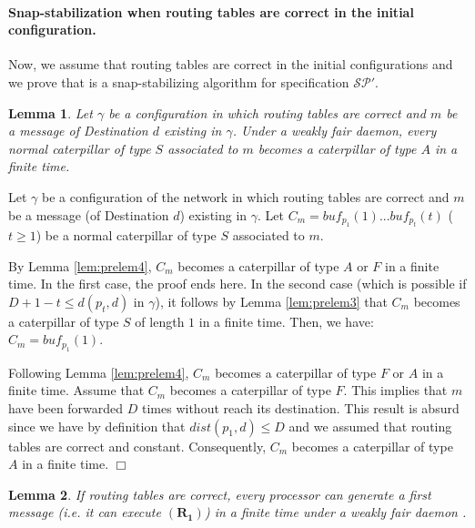 \documentclass[11pt]{article}
\newtheorem{lemma}{Lemma}
\newenvironment{proof}{{\noindent\bf Proof. } }{{\hfill $\Box$}}
\begin{document}
\paragraph{Snap-stabilization when routing tables are correct in the initial configuration.} Now, we assume that routing tables are correct in the initial configurations and we prove that \AD is a snap-stabilizing algorithm for specification $\mathcal{SP}'$.

\begin{lemma} \label{lem:chenilleSA}
Let $\gamma$ be a configuration in which routing tables are correct  and $m$ be a message of Destination $d$ existing in $\gamma$. Under a weakly fair daemon, every normal caterpillar of type $S$ associated to $m$ becomes a caterpillar of type $A$ in a finite time.
\end{lemma}

\begin{proof}
Let $\gamma$ be a configuration of the network in which routing tables are correct and $m$ be a message (of Destination $d$) existing in $\gamma$. Let $C_{m}=buf_{p_{1}}(1)...buf_{p_{t}}(t)$ ($t\geq1$) be a normal caterpillar of type $S$ associated to $m$.

By Lemma \ref{lem:prelem4}, $C_{m}$ becomes a caterpillar of type $A$ or $F$ in a finite time. In the first case, the proof ends here. In the second case (which is possible if $D+1-t\leq d(p_{t},d)$ in $\gamma$), it follows by Lemma \ref{lem:prelem3} that $C_{m}$ becomes a caterpillar of type $S$ of length $1$ in a finite time. Then, we have: $C_{m}=buf_{p_{1}}(1)$. 

Following Lemma \ref{lem:prelem4}, $C_{m}$ becomes a caterpillar of type $F$ or $A$ in a finite time. Assume that $C_{m}$ becomes a caterpillar of type $F$. This implies that $m$ have been forwarded $D$ times without reach its destination. This result is absurd since we have by definition that $dist(p_{1},d)\leq D$ and we assumed that routing tables are correct and constant. Consequently, $C_{m}$ becomes a caterpillar of type $A$ in a finite time.
\end{proof}

\begin{lemma} \label{lem:depotD}
If routing tables are correct, every processor can generate a first message (\emph{i.e.} it can execute $\boldsymbol{(R_{1})}$) in a finite time under a weakly fair daemon .
\end{lemma}
\end{document}
